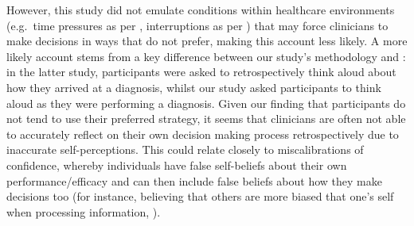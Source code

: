 \documentclass[a4paper, nobind]{templates/ociamthesis}
\begin{document}
However, this study did not emulate conditions within healthcare environments (e.g.~time pressures as per \textcite{gupta_associations_2023}, interruptions as per \textcite{soares_accuracy_2019}) that may force clinicians to make decisions in ways that do not prefer, making this account less likely. A more likely account stems from a key difference between our study's methodology and \textcite{coderre_diagnostic_2003}: in the latter study, participants were asked to retrospectively think aloud about how they arrived at a diagnosis, whilst our study asked participants to think aloud as they were performing a diagnosis. Given our finding that participants do not tend to use their preferred strategy, it seems that clinicians are often not able to accurately reflect on their own decision making process retrospectively due to inaccurate self-perceptions. This could relate closely to miscalibrations of confidence, whereby individuals have false self-beliefs \autocite{oeberst_toward_2023} about their own performance/efficacy \autocite{alicke_better-than-average_2005} and can then include false beliefs about how they make decisions too (for instance, believing that others are more biased that one's self when processing information, \textcite{pronin_bias_2002}).\\
\end{document}
